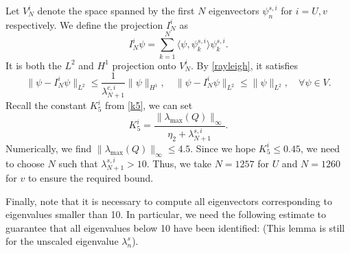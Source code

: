 \documentclass[11pt,a4paper]{article}
\numberwithin{equation}{section}
\begin{document}
Let $V_N^i$ denote the space spanned by the first $N$ eigenvectors $\psi_n^{s,
i}$ for $i = U, v$ respectively. We define the projection $I^i_N$ as
\begin{equation}
    I^i_N \psi = \sum_{k = 1}^N \langle \psi, \psi_k^{s, i} \rangle \psi_k^{s,
   i} . \label{eq:I def}
\end{equation}
It is both the $L^2$ and $H^1$ projection onto $V_N^i$. By \eqref{rayleigh},
it satisfies
\[ \| \psi - I^i_N \psi \|_{L^2} \leqslant \frac{1}{\lambda_{N + 1}^{c, i}} \|
   \psi \|_{H^1}, \quad \| \psi - I^i_N \psi \|_{L^2} \leqslant \| \psi
   \|_{L^2}, \quad \forall \psi \in V. \]
Recall the constant $K_5^i$ from \eqref{k5}, we can set
\[ K_5^i = \frac{\| \lambda_{\max} (Q)\|_{\infty}}{\eta_2 + \lambda_{N
   + 1}^{s, i}} . \]
Numerically, we find $\| \lambda_{\max} (Q)\|_{\infty} \leqslant 4.5$. Since
we hope $K_5^i \leqslant 0.45$, we need to choose $N$ such that
$\lambda_{N + 1}^{s, i} > 10$. Thus, we take $N = 1257$ for $U$ and $N = 1260$
for $v$ to ensure the required bound.

Finally, note that it is necessary to compute all eigenvectors corresponding
to eigenvalues smaller than 10. In particular, we need the following estimate
to guarantee that all eigenvalues below 10 have been identified: (This lemma
is still for the unscaled eigenvalue $\lambda^s_n$).
\end{document}
